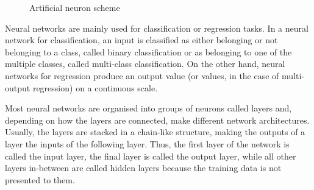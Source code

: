 \begin{figure}
    \centering
    \caption{Artificial neuron scheme}
    \label{fig:Neuron}
\end{figure}


Neural networks are mainly used for classification or regression tasks. In a neural network for classification, an input is classified as either belonging or not belonging to a class, called binary classification or as belonging to one of the multiple classes, called multi-class classification. On the other hand, neural networks for regression produce an output value (or values, in the case of multi-output regression) on a continuous scale.

Most neural networks are organised into groups of neurons called layers and, depending on how the layers are connected, make different network architectures. Usually, the layers are stacked in a chain-like structure, making the outputs of a layer the inputs of the following layer. Thus, the first layer of the network is called the input layer, the final layer is called the output layer, while all other layers in-between are called hidden layers because the training data is not presented to them.

